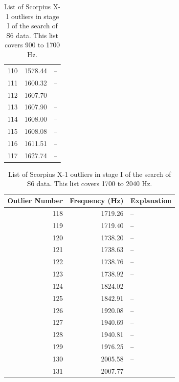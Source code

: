 \begin{table}
\begin{center}
\begin{tabular}{r r l}
110 & 1578.44 & -- \\
111 & 1600.32 & -- \\
112 & 1607.70 & -- \\
113 & 1607.90 & -- \\
114 & 1608.00 & -- \\
115 & 1608.08 & -- \\
116 & 1611.51 & -- \\
117 & 1627.74 & -- \\
\end{tabular}
\caption{List of Scorpius X-1 outliers in stage I of the search of S6 data. This list covers 900 to 1700 Hz.}
\label{ScoX1S6outlierTableHF2}
\end{center}
\end{table}

\begin{table}
\begin{center}
\begin{tabular}{r r l}
Outlier Number & Frequency (Hz) & Explanation \\
\hline
118 & 1719.26 & -- \\
119 & 1719.40 & -- \\
120 & 1738.20 & -- \\
121 & 1738.63 & -- \\
122 & 1738.76 & -- \\
123 & 1738.92 & -- \\
124 & 1824.02 & -- \\
125 & 1842.91 & -- \\
126 & 1920.08 & -- \\
127 & 1940.69 & -- \\
128 & 1940.81 & -- \\
129 & 1976.25 & -- \\
130 & 2005.58 & -- \\
131 & 2007.77 & -- \\
\end{tabular}
\caption{List of Scorpius X-1 outliers in stage I of the search of S6 data. This list covers 1700 to 2040 Hz.}
\label{ScoX1S6outlierTableHF3}
\end{center}
\end{table}



